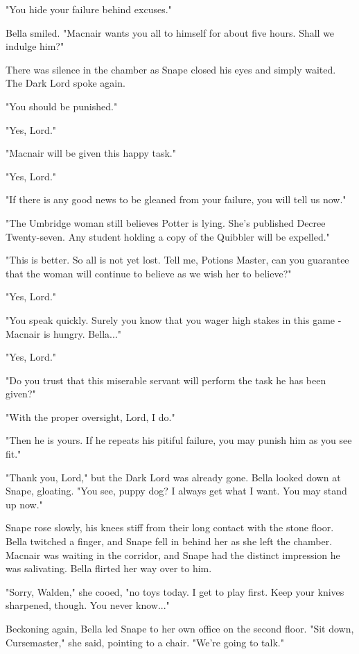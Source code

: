 \documentclass[a4paper,11pt]{article}
\begin{document}
"You hide your failure behind excuses."

Bella smiled. "Macnair wants you all to himself for about five hours. Shall we indulge him?"

There was silence in the chamber as Snape closed his eyes and simply waited. The Dark Lord spoke again.

"You should be punished."

"Yes, Lord."

"Macnair will be given this happy task."

"Yes, Lord."

"If there is any good news to be gleaned from your failure, you will tell us now."

"The Umbridge woman still believes Potter is lying. She's published Decree Twenty-seven. Any student holding a copy of the Quibbler will be expelled."

"This is better. So all is not yet lost. Tell me, Potions Master, can you guarantee that the woman will continue to believe as we wish her to believe?"

"Yes, Lord."

"You speak quickly. Surely you know that you wager high stakes in this game - Macnair is hungry. Bella..."

"Yes, Lord."

"Do you trust that this miserable servant will perform the task he has been given?"

"With the proper oversight, Lord, I do."

"Then he is yours. If he repeats his pitiful failure, you may punish him as you see fit."

"Thank you, Lord," but the Dark Lord was already gone. Bella looked down at Snape, gloating. "You see, puppy dog? I always get what I want. You may stand up now."

Snape rose slowly, his knees stiff from their long contact with the stone floor. Bella twitched a finger, and Snape fell in behind her as she left the chamber. Macnair was waiting in the corridor, and Snape had the distinct impression he was salivating. Bella flirted her way over to him.

"Sorry, Walden," she cooed, "no toys today. I get to play first. Keep your knives sharpened, though. You never know..."

Beckoning again, Bella led Snape to her own office on the second floor. "Sit down, Cursemaster," she said, pointing to a chair. "We're going to talk."
\end{document}
